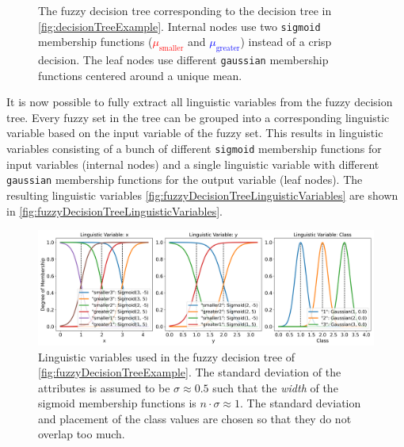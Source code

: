 \begin{figure}[H]

    \caption[Fuzzy decision tree created from the regular decision tree]{The fuzzy decision tree corresponding to the decision tree in \autoref{fig:decisionTreeExample}. Internal nodes use two \texttt{sigmoid} membership functions (\textcolor{red}{$\mu_{\text{smaller}}$} and \textcolor{blue}{$\mu_{\text{greater}}$}) instead of a crisp decision. The leaf nodes use different \texttt{gaussian} membership functions centered around a unique mean.}

    \label{fig:fuzzyDecisionTreeExample}
\end{figure}

It is now possible to fully extract all linguistic variables from the fuzzy decision tree. Every fuzzy set in the tree can be grouped into a corresponding linguistic variable based on the input variable of the fuzzy set. This results in linguistic variables consisting of a bunch of different \texttt{sigmoid} membership functions for input variables (internal nodes) and a single linguistic variable with different \texttt{gaussian} membership functions for the output variable (leaf nodes). The resulting linguistic variables \autoref{fig:fuzzyDecisionTreeLinguisticVariables} are shown in \autoref{fig:fuzzyDecisionTreeLinguisticVariables}.


\begin{figure}[h]
    \centering

    \includegraphics[width=\linewidth]{figures/ProofOfConcepts/fuzzy_sets.png}

    \caption[Linguistic variables for the converted fuzzy decision tree]{Linguistic variables used in the fuzzy decision tree of \autoref{fig:fuzzyDecisionTreeExample}. The standard deviation of the attributes is assumed to be $\sigma \approx 0.5$ such that the \emph{width} of the sigmoid membership functions is $n\cdot \sigma \approx 1$. The standard deviation and placement of the class values are chosen so that they do not overlap too much.}
    \label{fig:fuzzyDecisionTreeLinguisticVariables}
\end{figure}

